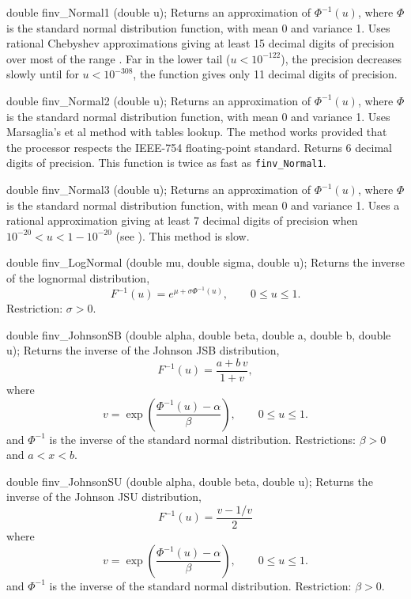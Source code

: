 double finv_Normal1 (double u);
\endcode
  \tab
  Returns an approximation of $\Phi^{-1}(u)$,
  where $\Phi$ is the standard normal distribution function,
  with mean 0 and variance 1.
  Uses rational Chebyshev approximations giving at least 15 decimal
  digits of precision over most of the range \cite{tBLA76a}.
  Far in the lower tail ($u < 10 ^{-122}$), the precision decreases slowly
  until for $u < 10 ^{-308}$, the function gives only 11 decimal
  digits of precision.
 \endtab
\code


double finv_Normal2 (double u);
\endcode
  \tab
  Returns an approximation of $\Phi^{-1}(u)$,
  where $\Phi$ is the standard normal distribution function, with mean 0 and
  variance 1. Uses Marsaglia's et al \cite{rMAR94b} method
  with tables lookup. The method works provided that
  the processor respects the IEEE-754 floating-point standard.
  Returns 6 decimal digits of precision. This function is twice as fast
  as {\tt finv\_Normal1}.
 \endtab
\hide\code


double finv_Normal3 (double u);
\endcode
  \tab
  Returns an approximation of $\Phi^{-1}(u)$,
  where $\Phi$ is the standard normal distribution function,
  with mean 0 and variance 1.
  Uses a rational approximation giving at least 7 decimal digits of
  precision when  $10^{-20} < u < 1 - 10^{-20}$
  (see \cite{sBRA87a,tKEN80a}). This method is slow.
 \endtab
\endhide\code


double finv_LogNormal (double mu, double sigma, double u);
\endcode
  \tab
  Returns the inverse of the lognormal distribution,
$$
     F^{-1}(u) = e^{\mu + \sigma\Phi^{-1} (u)},
          \qquad  0 \le u \le 1.
$$
  Restriction: $\sigma > 0$.
 \endtab
\code


double finv_JohnsonSB (double alpha, double beta, double a, double b,
                       double u);
\endcode
  \tab
  Returns the inverse of the Johnson JSB distribution,
$$
     F^{-1}(u) = \frac {a + b\,v}{1 + v},
$$
 where
$$
     v = \exp \left({\frac{\Phi^{-1}(u) - \alpha}{\beta}}\right),
              \qquad  0 \le u \le 1.
$$
 and $\Phi^{-1}$ is the inverse of the standard normal distribution.
 Restrictions: $\beta>0$ and $a < x < b$.
 \endtab
\code


double finv_JohnsonSU (double alpha, double beta, double u);
\endcode
  \tab
  Returns the inverse of the Johnson JSU distribution,
$$
     F^{-1}(u) = \frac {v - 1/v}{2}
$$
  where
$$
      v = \exp \left({\frac{\Phi^{-1}(u) - \alpha}{\beta}}\right),
          \qquad  0 \le u \le 1.
$$
and $\Phi^{-1}$ is the inverse of the standard normal distribution.
Restriction: $\beta>0$.
 \endtab
\code


